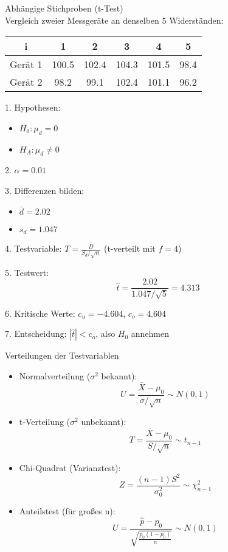 
\begin{example2}{Abhängige Stichproben (t-Test)}\\
Vergleich zweier Messgeräte an denselben 5 Widerständen:

\begin{center}
\begin{tabular}{|c|c|c|c|c|c|}
\hline
i & 1 & 2 & 3 & 4 & 5 \\
\hline
Gerät 1 & 100.5 & 102.4 & 104.3 & 101.5 & 98.4 \\
\hline
Gerät 2 & 98.2 & 99.1 & 102.4 & 101.1 & 96.2 \\
\hline
\end{tabular}
\end{center}

1. Hypothesen:
   \begin{itemize}
     \item $H_0: \mu_d = 0$
     \item $H_A: \mu_d \neq 0$
   \end{itemize}

2. $\alpha = 0.01$

3. Differenzen bilden:
   \begin{itemize}
     \item $\bar{d} = 2.02$
     \item $s_d = 1.047$
   \end{itemize}

4. Testvariable: $T = \frac{\bar{D}}{S_d/\sqrt{n}}$ (t-verteilt mit $f=4$)

5. Testwert:
   $$\hat{t} = \frac{2.02}{1.047/\sqrt{5}} = 4.313$$

6. Kritische Werte: $c_u = -4.604$, $c_o = 4.604$

7. Entscheidung: $|\hat{t}| < c_o$, also $H_0$ annehmen
\end{example2}

\begin{theorem}{Verteilungen der Testvariablen}\\
\begin{itemize}
  \item Normalverteilung ($\sigma^2$ bekannt):
    $$U = \frac{\bar{X}-\mu_0}{\sigma/\sqrt{n}} \sim N(0,1)$$
  
  \item t-Verteilung ($\sigma^2$ unbekannt):
    $$T = \frac{\bar{X}-\mu_0}{S/\sqrt{n}} \sim t_{n-1}$$
  
  \item Chi-Quadrat (Varianztest):
    $$Z = \frac{(n-1)S^2}{\sigma_0^2} \sim \chi^2_{n-1}$$
  
  \item Anteilstest (für großes n):
    $$U = \frac{\hat{p}-p_0}{\sqrt{\frac{p_0(1-p_0)}{n}}} \sim N(0,1)$$
\end{itemize}
\end{theorem}

